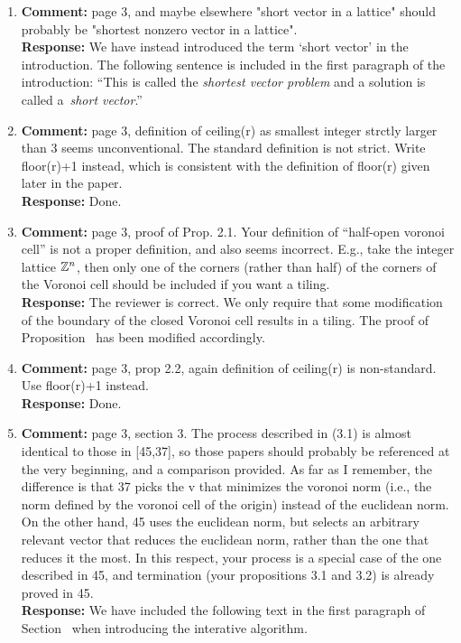 \documentclass[a4paper,10pt]{article}
\begin{document}
\begin{enumerate}
\item\textbf{Comment:}  
page 3, and maybe elsewhere "short vector in a lattice" should probably be "shortest nonzero vector in a lattice". 
\\\textbf{Response:}
We have instead introduced the term `short vector' in the introduction.  The following sentence is included in the first paragraph of the introduction: ``This is called the \emph{shortest vector problem} and a solution is called a~\emph{short vector}.''

\item\textbf{Comment:}  
page 3, definition of ceiling(r) as smallest integer strctly larger than 3 seems unconventional. The standard definition is not strict. Write floor(r)+1 instead, which is consistent with the definition of floor(r) given later in the paper. 
\\\textbf{Response:}
Done.

\item\textbf{Comment:}  
page 3, proof of Prop. 2.1. Your definition of ``half-open voronoi cell'' is not a proper definition, and also seems incorrect. E.g., take the integer lattice ${\mathbb Z}^n$, then only one of the corners (rather than half) of the corners of the Voronoi cell should be included if you want a tiling. 
\\\textbf{Response:}
The reviewer is correct.  We only require that some modification of the boundary of the closed Voronoi cell results in a tiling.  The proof of Proposition~ has been modified accordingly.

\item\textbf{Comment:}  
page 3, prop 2.2, again definition of ceiling(r) is non-standard. Use floor(r)+1 instead. 
\\\textbf{Response:}
Done. 

\item\textbf{Comment:}  
page 3, section 3. 
The process described in (3.1) is almost identical to those in [45,37], so those papers should probably be referenced at the very beginning, and a comparison provided. As far as I remember, the difference is that 37 picks the v that minimizes the voronoi norm (i.e., the norm defined by the voronoi cell of the origin) instead of the euclidean norm. On the other hand, 45 uses the euclidean norm, but selects an arbitrary relevant vector that reduces the euclidean norm, rather than the one that reduces it the most. In this respect, your process is a special case of the one described in 45, and termination (your propositions 3.1 and 3.2) is already proved in 45. 
\\\textbf{Response:}
We have included the following text in the first paragraph of Section~ when introducing the interative algorithm.


\end{enumerate}
\end{document}
